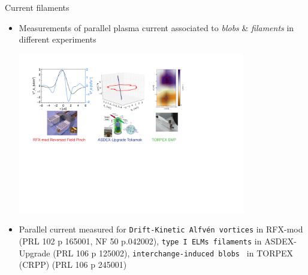 \documentclass[t,10pt]{beamer}
\begin{document}
\begin{frame}{Current filaments}
\begin{itemize}
\item {\small Measurements of parallel plasma current associated to
  \emph{blobs} \& \emph{filaments} in different experiments}
\begin{center}
\includegraphics[width=0.78\textwidth]{all-currents}
\end{center}

\item {\small Parallel current measured for
  \textcolor{ta3scarletred}{\texttt{Drift-Kinetic Alfv\'en vortices}}
  in RFX-mod {\tiny (PRL 102 p 165001, NF 50 p.042002)},
  \textcolor{ta3skyblue}{\texttt{type I ELMs  filaments}} in ASDEX-Upgrade {\tiny (PRL 106 p 125002)}, 
  \textcolor{ta3chameleon}{\texttt{interchange-induced blobs }} in TORPEX (CRPP) {\tiny (PRL 106 p 245001)}}
\end{itemize}
\end{frame}
\end{document}
